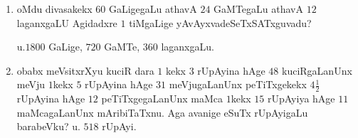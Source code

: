 \begin{enumerate}[\rm(1)]
\item oMdu divasakekx $60$ GaLigegaLu athavA $24$ GaMTegaLu athavA $12$ laganxgaLU Agidadxre $1$ tiMgaLige yAvAyxvadeSeTxSATxguvadu? 

\hfill u.$1800$ GaLige, $720$ GaMTe, $360$ laganxgaLu.

\item obabx meVsitxrXyu kuciR dara $1$ kekx $3$ rUpAyina hAge $48$ kuciRgaLanUnx meVju $1$kekx $5$ rUpAyina hAge $31$ meVjugaLanUnx peTiTxgekekx $4\frac{1}{2}$ rUpAyina hAge $12$ peTiTxgegaLanUnx maMca $1$kekx $15$ rUpAyiya hAge $11$ maMcagaLanUnx mAribiTaTxnu. Aga avanige eSuTx rUpAyigaLu barabeVku? \hfill u. $518$ rUpAyi.                   

\end{enumerate}
